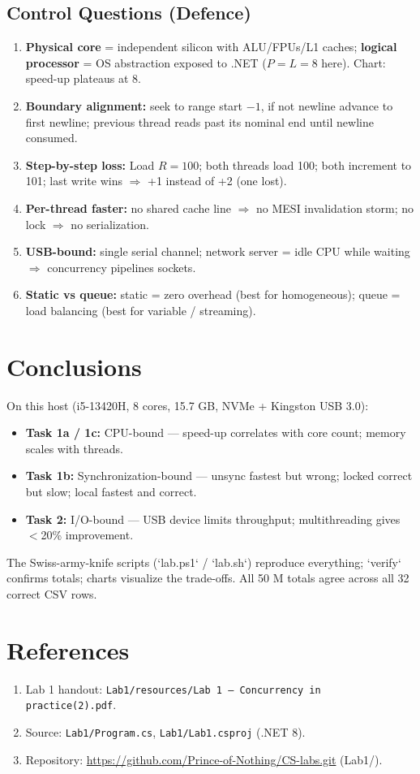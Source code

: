 \documentclass[12pt,a4paper]{article}
\begin{document}
\subsection{Control Questions (Defence)}
\begin{enumerate}
    \item \textbf{Physical core} = independent silicon with ALU/FPUs/L1 caches; \textbf{logical processor} = OS abstraction exposed to .NET ($P=L=8$ here). Chart: speed-up plateaus at 8.
    \item \textbf{Boundary alignment:} seek to range start $-1$, if not newline advance to first newline; previous thread reads past its nominal end until newline consumed.
    \item \textbf{Step-by-step loss:} Load $R=100$; both threads load 100; both increment to 101; last write wins $\Rightarrow$ +1 instead of +2 (one lost).
    \item \textbf{Per-thread faster:} no shared cache line $\Rightarrow$ no MESI invalidation storm; no lock $\Rightarrow$ no serialization.
    \item \textbf{USB-bound:} single serial channel; network server = idle CPU while waiting $\Rightarrow$ concurrency pipelines sockets.
    \item \textbf{Static vs queue:} static = zero overhead (best for homogeneous); queue = load balancing (best for variable / streaming).
\end{enumerate}

\section{Conclusions}
On this host (i5-13420H, 8 cores, 15.7 GB, NVMe + Kingston USB 3.0):
\begin{itemize}
    \item \textbf{Task 1a / 1c:} CPU-bound --- speed-up correlates with core count; memory scales with threads.
    \item \textbf{Task 1b:} Synchronization-bound --- unsync fastest but wrong; locked correct but slow; local fastest and correct.
    \item \textbf{Task 2:} I/O-bound --- USB device limits throughput; multithreading gives $<$20\% improvement.
\end{itemize}
The Swiss-army-knife scripts (`lab.ps1` / `lab.sh`) reproduce everything; `verify` confirms totals; charts visualize the trade-offs. All 50 M totals agree across all 32 correct CSV rows.

\section{References}
\begin{enumerate}
    \item Lab 1 handout: \texttt{Lab1/resources/Lab 1 --- Concurrency in practice(2).pdf}.
    \item Source: \texttt{Lab1/Program.cs}, \texttt{Lab1/Lab1.csproj} (.NET 8).
    \item Repository: \url{https://github.com/Prince-of-Nothing/CS-labs.git} (Lab1/).
\end{enumerate}
\end{document}
